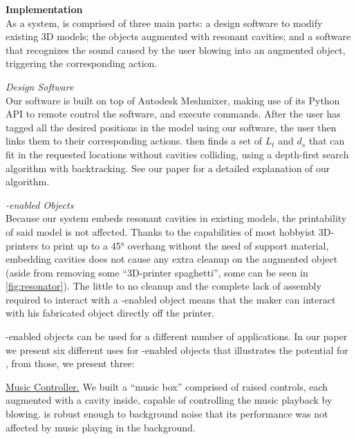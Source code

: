         \textbf{Implementation}\\
          As a system, \bh is comprised of three main parts: a design software
          to modify existing 3D models; the objects augmented with resonant
          cavities; and a software that recognizes the sound caused by the user
          blowing into an augmented object, triggering the corresponding
          action.
          
          \textit{Design Software}\\
            Our software is built on top of Autodesk Meshmixer, making use of
            its Python API to remote control the software, and execute commands.
            After the user has tagged all the desired positions in the model
            using our software, the user then links them to their corresponding actions. \bh then finds a set of $L_t$ and $d_s$ that can fit in the requested
            locations without cavities colliding, using a depth-first search
            algorithm with backtracking. See our paper for a detailed
            explanation of our algorithm.
            
          \textit{\bh-enabled Objects}\\
            Because our system embeds resonant cavities in existing models, the
            printability of said model is not affected. Thanks to the
            capabilities of most hobbyist 3D-printers to print up to a 45°
            overhang without the need of support material, embedding \bh
            cavities does not cause any extra cleanup on the augmented object
            (aside from removing some ``3D-printer spaghetti'', some can
            be seen in \cref{fig:resonator}). The little to no cleanup and
            the complete lack of assembly required to interact with a
            \bh-enabled object means that the maker can interact with his
            fabricated object directly off the printer.
            
            \bh-enabled objects can be used for a different number of
            applications. In our paper we present six different uses for
            \bh-enabled objects that illustrates the potential for \bh, from
            those, we present three:
            
              \underline{Music Controller.} We built a ``music box'' comprised
              of raised controls, each augmented with a \bh cavity inside,
              capable of controlling the music playback by blowing. \bh is
              robust enough to background noise that its performance was not
              affected by music playing in the background.
              
